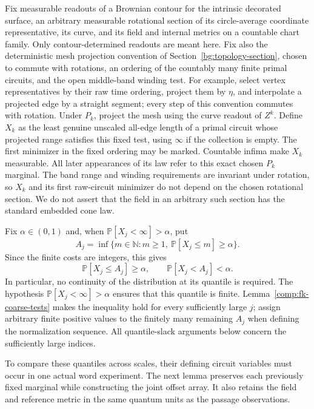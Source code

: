 Fix measurable readouts of a Brownian contour for the
intrinsic decorated surface, an arbitrary measurable rotational section
of its circle-average coordinate representative,
its curve, and its field and internal metrics on a countable chart
family.  Only contour-determined readouts are meant here.  Fix also
the deterministic mesh projection convention of
Section~\ref{bg:topology-section}, chosen to commute with rotations,
an ordering of the countably many finite primal circuits, and the open
middle-band winding test.
For example, select vertex representatives by their raw time ordering,
project them by $\eta$, and interpolate a projected edge by a straight
segment; every step of this convention commutes with rotation.
Under $P_k$, project the mesh using the curve readout of $Z^k$.
Define $X_k$ as the least genuine unscaled all-edge length of a
primal circuit whose projected range satisfies this fixed test,
using $\infty$ if the collection is empty.  The first minimizer in
the fixed ordering may be marked.  Countable infima make $X_k$
measurable.  All later appearances of its law refer to this exact
chosen $P_k$ marginal.
The band range and winding requirements are invariant under rotation,
so $X_k$ and its first raw-circuit minimizer do not depend on the chosen
rotational section.  We do not assert that the field in an arbitrary
such section has the standard embedded cone law.

Fix $\alpha\in(0,1)$
and, when $\mathbb P[X_j<\infty]>\alpha$, put
\begin{equation}\label{comp:quantile}
 A_j=\inf\{m\in\mathbb N:m\ge1,\ \mathbb P[X_j\le m]\ge\alpha\}.
\end{equation}
Since the finite costs are integers, this gives
\begin{equation}\label{comp:quantile-slack}
 \mathbb P[X_j\le A_j]\ge\alpha,
 \qquad \mathbb P[X_j<A_j]<\alpha.
\end{equation}
In particular, no continuity of the distribution at its quantile is
required.  The hypothesis \mbox{$\mathbb P[X_j<\infty]>\alpha$} ensures that
this quantile is finite.
Lemma~\ref{comp:fk-coarse-tests} makes the inequality hold for every
sufficiently large $j$; assign arbitrary finite positive values to the
finitely many remaining $A_j$ when defining the normalization sequence.
All quantile-slack arguments below concern the sufficiently large indices.

To compare these quantiles across scales, their defining circuit
variables must occur in one actual word experiment.  The next lemma
preserves each previously fixed marginal while constructing the joint
offset array.  It also retains the field and reference metric in the
same quantum units as the passage observations.

